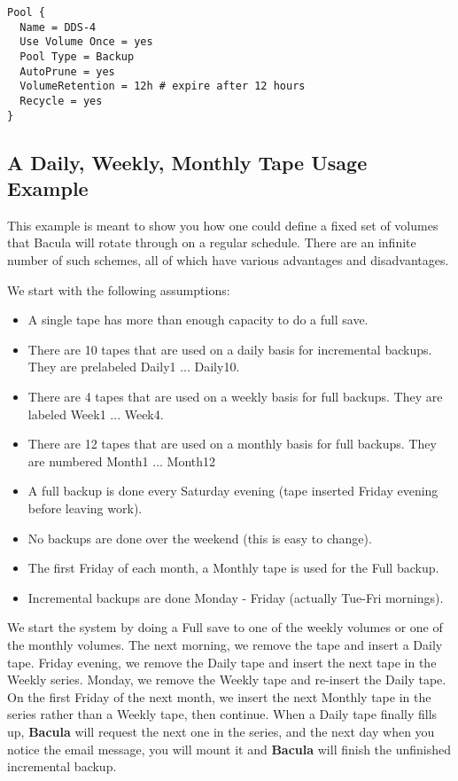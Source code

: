 \footnotesize
\begin{verbatim}
Pool {
  Name = DDS-4
  Use Volume Once = yes
  Pool Type = Backup
  AutoPrune = yes
  VolumeRetention = 12h # expire after 12 hours
  Recycle = yes
}
\end{verbatim}
\normalsize

\subsection*{A Daily, Weekly, Monthly Tape Usage Example}
\label{usageexample}

This example is meant to show you how one could define a fixed set of volumes
that Bacula will rotate through on a regular schedule. There are an infinite
number of such schemes, all of which have various advantages and
disadvantages. 

We start with the following assumptions: 

\begin{itemize}
\item A single tape has more than enough capacity to do  a full save.  
\item There are 10 tapes that are used on a daily basis  for incremental
   backups. They are prelabeled Daily1 ...  Daily10.  
\item There are 4 tapes that are used on a weekly basis  for full backups.
   They are labeled Week1 ... Week4.  
\item There are 12 tapes that are used on a monthly basis  for full backups.
   They are numbered Month1 ... Month12  
\item A full backup is done every Saturday evening (tape inserted  Friday
   evening before leaving work).  
\item No backups are done over the weekend (this is easy to  change).  
\item The first Friday of each month, a Monthly tape is used for  the Full
   backup.  
\item Incremental backups are done Monday - Friday (actually  Tue-Fri
   mornings). 
   \end{itemize}

We start the system by doing a Full save to one of the weekly volumes or one
of the monthly volumes. The next morning, we remove the tape and insert a
Daily tape. Friday evening, we remove the Daily tape and insert the next tape
in the Weekly series. Monday, we remove the Weekly tape and re-insert the
Daily tape. On the first Friday of the next month, we insert the next Monthly
tape in the series rather than a Weekly tape, then continue. When a Daily tape
finally fills up, {\bf Bacula} will request the next one in the series, and
the next day when you notice the email message, you will mount it and {\bf
Bacula} will finish the unfinished incremental backup. 

